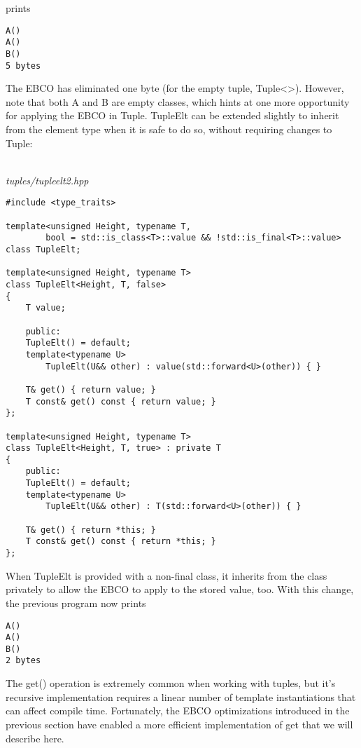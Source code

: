 prints

\begin{lstlisting}[style=styleCXX]
A()
A()
B()
5 bytes
\end{lstlisting}

The EBCO has eliminated one byte (for the empty tuple, Tuple<>). However, note that both A and B are empty classes, which hints at one more opportunity for applying the EBCO in Tuple. TupleElt can be extended slightly to inherit from the element type when it is safe to do so, without requiring changes to Tuple:

\hspace*{\fill} \\ %
\noindent
\textit{tuples/tupleelt2.hpp}
\begin{lstlisting}[style=styleCXX]
#include <type_traits>

template<unsigned Height, typename T,
		bool = std::is_class<T>::value && !std::is_final<T>::value>
class TupleElt;

template<unsigned Height, typename T>
class TupleElt<Height, T, false>
{
	T value;
	
	public:
	TupleElt() = default;
	template<typename U>
		TupleElt(U&& other) : value(std::forward<U>(other)) { }
		
	T& get() { return value; }
	T const& get() const { return value; }
};

template<unsigned Height, typename T>
class TupleElt<Height, T, true> : private T
{
	public:
	TupleElt() = default;
	template<typename U>
		TupleElt(U&& other) : T(std::forward<U>(other)) { }
		
	T& get() { return *this; }
	T const& get() const { return *this; }
};
\end{lstlisting}

When TupleElt is provided with a non-final class, it inherits from the class privately to allow the EBCO to apply to the stored value, too. With this change, the previous program now prints

\begin{lstlisting}[style=styleCXX]
A()
A()
B()
2 bytes
\end{lstlisting}


The get() operation is extremely common when working with tuples, but it’s recursive implementation requires a linear number of template instantiations that can affect compile time. Fortunately, the EBCO optimizations introduced in the previous section have enabled a more efficient implementation of get that we will describe here.

